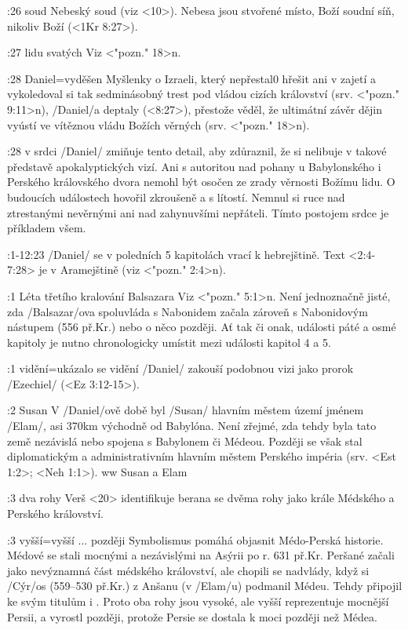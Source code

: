 :26 {soud} Nebeský soud (viz <10>). Nebesa jsou stvořené místo, Boží soudní síň, nikoliv Boží  (<1Kr 8:27>). 

:27 {lidu svatých} Viz  <"pozn." 18>n.

 :28 {Daniel}={vyděšen} Myšlenky o Izraeli, který nepřestal0 hřešit ani v zajetí a vykoledoval si tak sedminásobný trest pod vládou cizích království   (srv. <"pozn." 9:11>n),
\x/Daniel/a deptaly (<8:27>), přestože věděl, že ultimátní závěr dějin vyústí ve vítěznou vládu Božích věrných  (srv. <"pozn." 18>n). 

 :28 {v srdci} \x/Daniel/ zmiňuje tento detail, aby zdůraznil, že si nelibuje v takové představě apokalyptických vizí.  Ani s autoritou nad pohany u Babylonského i Perského královského dvora nemohl být osočen ze zrady věrnosti Božímu lidu. O budoucích událostech hovořil zkroušeně a s lítostí. Nemnul si ruce nad ztrestanými nevěrnými ani nad zahynuvšími nepřáteli. Tímto postojem srdce je příkladem všem.
 
:1-12:23 {} \x/Daniel/ se v poledních 5 kapitolách vrací k hebrejštině. Text <2:4-7:28>
je v Aramejštině (viz <"pozn." 2:4>n).
   
:1 {Léta třetího kralování Balsazara}
     Viz <"pozn." 5:1>n. Není jednoznačně jisté, zda \x/Balsazar/ova
     spoluvláda s Nabonidem začala zároveň s Nabonidovým nástupem (556 př.Kr.) nebo o něco
     později. Ať tak či onak, události páté a osmé kapitoly je nutno chronologicky umístit
     mezi události kapitol 4 a 5. 

:1 {vidění}={ukázalo se vidění} \x/Daniel/ zakouší podobnou  vizi jako prorok \x/Ezechiel/ (<Ez 3:12-15>).

:2 {Susan} V \x/Daniel/ově době byl \x/Susan/ hlavním městem území jménem \x/Elam/,  
asi 370km východně od Babylóna. Není zřejmé, zda tehdy byla  tato země  nezávislá nebo spojena s Babylonem či Médeou. Později se však stal diplomatickým a administrativním hlavním městem Perského impéria (srv. <Est 1:2>; <Neh 1:1>).
\dopsat ww Susan a Elam


:3 {dva rohy} Verš <20> identifikuje berana se dvěma rohy jako krále Médského a Perského království.

:3 {vyšší}={vyšší ... později} Symbolismus pomáhá objasnit Médo-Perská historie. Médové se stali mocnými a nezávislými na Asýrii po r. 631 př.Kr. Peršané začali jako nevýznamná část médského království, ale chopili se nadvlády, když si \x/Cýr/os (559--530 př.Kr.) z Anšanu (v \x/Elam/u) podmanil Médeu. Tehdy připojil ke svým titulům i . Proto oba rohy jsou vysoké, ale vyšší reprezentuje mocnější Persii, a vyrostl později, protože Persie se dostala k moci později než Médea.

